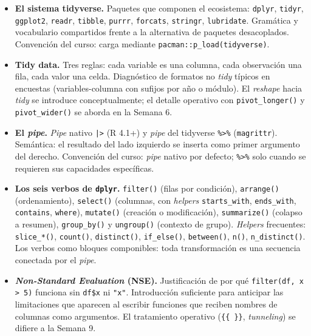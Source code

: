 \documentclass[11pt,letterpaper]{article}
\begin{document}
\begin{itemize}[leftmargin=*, itemsep=2pt]
    \item \textbf{El sistema tidyverse.} Paquetes que componen el ecosistema: \texttt{dplyr}, \texttt{tidyr}, \texttt{ggplot2}, \texttt{readr}, \texttt{tibble}, \texttt{purrr}, \texttt{forcats}, \texttt{stringr}, \texttt{lubridate}. Gramática y vocabulario compartidos frente a la alternativa de paquetes desacoplados. Convención del curso: carga mediante \texttt{pacman::p\_load(tidyverse)}.
    \item \textbf{Tidy data.} Tres reglas: cada variable es una columna, cada observación una fila, cada valor una celda. Diagnóstico de formatos no \textit{tidy} típicos en encuestas (variables-columna con sufijos por año o módulo). El \textit{reshape} hacia \textit{tidy} se introduce conceptualmente; el detalle operativo con \texttt{pivot\_longer()} y \texttt{pivot\_wider()} se aborda en la Semana 6.
    \item \textbf{El \textit{pipe}.} \textit{Pipe} nativo \texttt{|>} (R 4.1+) y \textit{pipe} del tidyverse \texttt{\%>\%} (\texttt{magrittr}). Semántica: el resultado del lado izquierdo se inserta como primer argumento del derecho. Convención del curso: \textit{pipe} nativo por defecto; \texttt{\%>\%} solo cuando se requieren sus capacidades específicas.
    \item \textbf{Los seis verbos de \texttt{dplyr}.} \texttt{filter()} (filas por condición), \texttt{arrange()} (ordenamiento), \texttt{select()} (columnas, con \textit{helpers} \texttt{starts\_with}, \texttt{ends\_with}, \texttt{contains}, \texttt{where}), \texttt{mutate()} (creación o modificación), \texttt{summarize()} (colapso a resumen), \texttt{group\_by()} y \texttt{ungroup()} (contexto de grupo). \textit{Helpers} frecuentes: \texttt{slice\_*()}, \texttt{count()}, \texttt{distinct()}, \texttt{if\_else()}, \texttt{between()}, \texttt{n()}, \texttt{n\_distinct()}. Los verbos como bloques componibles: toda transformación es una secuencia conectada por el \textit{pipe}.
    \item \textbf{\textit{Non-Standard Evaluation} (NSE).} Justificación de por qué \texttt{filter(df, x > 5)} funciona sin \texttt{df\$x} ni \texttt{"x"}. Introducción suficiente para anticipar las limitaciones que aparecen al escribir funciones que reciben nombres de columnas como argumentos. El tratamiento operativo (\texttt{\{\{~\}\}}, \textit{tunneling}) se difiere a la Semana 9.
\end{itemize}
\end{document}
